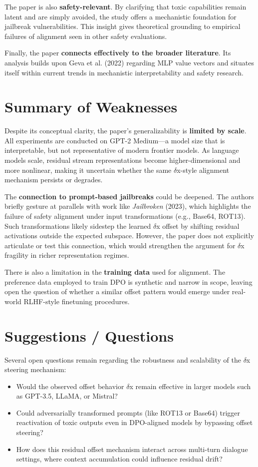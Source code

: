 \documentclass[10pt,a4paper]{article}
\begin{document}
The paper is also \textbf{safety-relevant}. By clarifying that toxic capabilities remain latent and are simply avoided, the study offers a mechanistic foundation for jailbreak vulnerabilities. This insight gives theoretical grounding to empirical failures of alignment seen in other safety evaluations.

Finally, the paper \textbf{connects effectively to the broader literature}. Its analysis builds upon Geva et al. (2022) regarding MLP value vectors and situates itself within current trends in mechanistic interpretability and safety research.

\vspace{1em}

\section{Summary of Weaknesses}
Despite its conceptual clarity, the paper's generalizability is \textbf{limited by scale}. All experiments are conducted on GPT-2 Medium---a model size that is interpretable, but not representative of modern frontier models. As language models scale, residual stream representations become higher-dimensional and more nonlinear, making it uncertain whether the same $\delta$x-style alignment mechanism persists or degrades.

The \textbf{connection to prompt-based jailbreaks} could be deepened. The authors briefly gesture at parallels with work like \textit{Jailbroken} (2023), which highlights the failure of safety alignment under input transformations (e.g., Base64, ROT13). Such transformations likely sidestep the learned $\delta$x offset by shifting residual activations outside the expected subspace. However, the paper does not explicitly articulate or test this connection, which would strengthen the argument for $\delta$x fragility in richer representation regimes.

There is also a limitation in the \textbf{training data} used for alignment. The preference data employed to train DPO is synthetic and narrow in scope, leaving open the question of whether a similar offset pattern would emerge under real-world RLHF-style finetuning procedures.

\vspace{1em}

\section{Suggestions / Questions}
Several open questions remain regarding the robustness and scalability of the $\delta$x steering mechanism:
\begin{itemize}
\item Would the observed offset behavior $\delta$x remain effective in larger models such as GPT-3.5, LLaMA, or Mistral?
\item Could adversarially transformed prompts (like ROT13 or Base64) trigger reactivation of toxic outputs even in DPO-aligned models by bypassing offset steering?
\item How does this residual offset mechanism interact across multi-turn dialogue settings, where context accumulation could influence residual drift?
\end{itemize}
\end{document}
